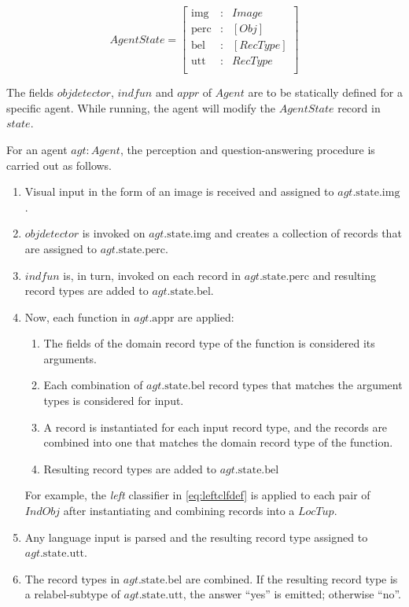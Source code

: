 \begin{equation}\label{eq:state}
AgentState = \left[\begin{array}{rcl}
    \text{img} &:& Image \\
    \text{perc} &:& [Obj] \\
    \text{bel} &:& [RecType] \\
    \text{utt} &:& RecType \\
    \end{array}\right]
\end{equation}

The fields $objdetector$, $indfun$ and $appr$ of $Agent$ are to be statically defined for a specific agent.
While running, the agent will modify the $AgentState$ record in $state$.

For an agent $agt : Agent$, the perception and question-answering procedure is carried out as follows.

\begin{enumerate}
\item Visual input in the form of an image is received and assigned to $agt.\text{state}.\text{img}$.
\item $objdetector$ is invoked on $agt.\text{state.img}$ and creates a collection of records that are assigned to $agt.\text{state}.\text{perc}$.
\item $indfun$ is, in turn, invoked on each record in $agt.\text{state.perc}$ and resulting record types are added to $agt.\text{state.bel}$.
\item Now, each function in $agt.\text{appr}$ are applied:
	\begin{enumerate}
	\item The fields of the domain record type of the function is considered its arguments.
	\item Each combination of $agt.\text{state.bel}$ record types that matches the argument types is considered for input.
	\item A record is instantiated for each input record type, and the records are combined into one that matches the domain record type of the function.
	\item Resulting record types are added to $agt.\text{state.bel}$
	\end{enumerate}
	For example, the \textit{left} classifier in \autoref{eq:leftclfdef} is applied to each pair of $IndObj$ after instantiating and combining records into a $LocTup$.
\item Any language input is parsed and the resulting record type assigned to $agt.\text{state.utt}$.
\item The record types in $agt.\text{state.bel}$ are combined. If the resulting record type is a relabel-subtype of $agt.\text{state.utt}$, the answer ``yes'' is emitted; otherwise ``no''.
\end{enumerate}


